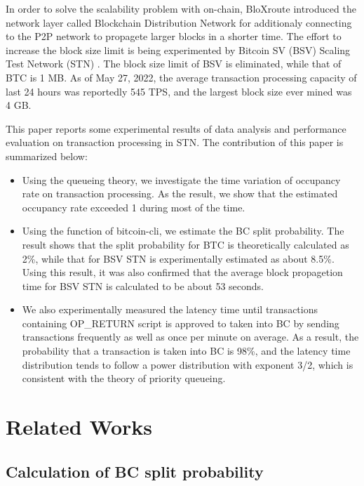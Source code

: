 \documentclass[graybox]{svmult}
\begin{document}
In order to solve the scalability problem with on-chain, 
BloXroute\cite{bloX} introduced the network layer called Blockchain Distribution Network for additionaly connecting to the P2P network to propagete larger blocks in a shorter time. 
The effort to increase the block size limit is being experimented by Bitcoin SV (BSV) \cite{bsv} Scaling Test Network (STN) \cite{bitcoinscaling}.
The block size limit of BSV is eliminated, while that of BTC is 1 MB. 
As of May 27, 2022, the average transaction processing capacity of last 24 hours was reportedly 545 TPS, and the largest block size ever mined was 4 GB. 


This paper reports some experimental results of data analysis and performance evaluation on transaction processing in STN. 
The contribution of this paper is summarized below: 
%
\begin{itemize}
  \item Using the queueing theory, we investigate the time variation of occupancy rate on transaction processing. 
	As the result, we show that the estimated occupancy rate exceeded 1 during most of the time. 
  \item Using the function of bitcoin-cli, we estimate the BC split probability. 
	The result shows that the split probability for BTC is theoretically calculated as 2\%, while that for BSV STN is experimentally estimated as about 8.5\%.
	Using this result, it was also confirmed that the average block propagetion time for BSV STN is calculated to be about 53 seconds. 
  \item We also experimentally measured the latency time until transactions containing OP\_RETURN script is approved to taken into BC by sending transactions frequently as well as once per minute on average. 
	As a result, the probability that a transaction is taken into BC is 98\%, and the latency time distribution tends to follow a power distribution with exponent 3/2, which is consistent with the theory of priority queueing. 
\end{itemize}
%




\section{Related Works}
\label{sec:rworks}

\subsection{Calculation of BC split probability}
\label{sec:fork}
\end{document}
